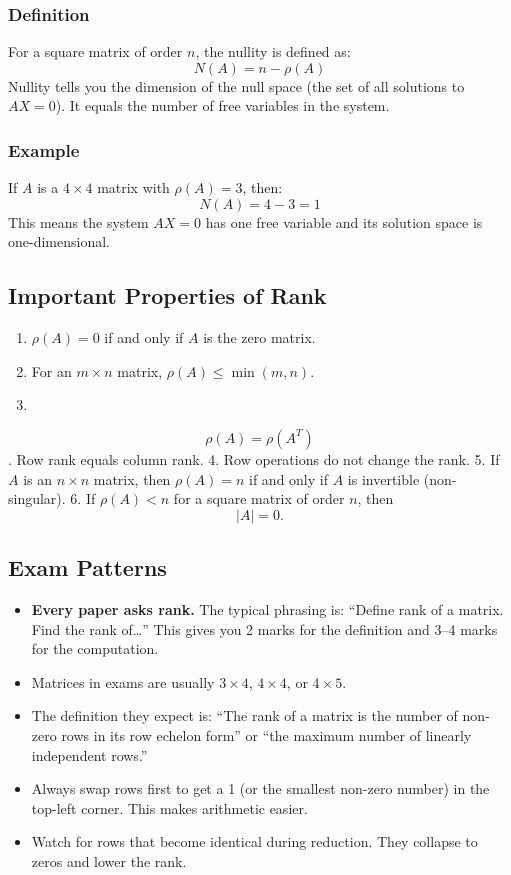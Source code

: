 \documentclass[
]{article}
\providecommand{\tightlist}{%
  \setlength{\itemsep}{0pt}\setlength{\parskip}{0pt}}
\begin{document}
\subsubsection{Definition}\label{definition-12}

For a square matrix of order \(n\), the nullity is defined as:
\[
N(A) = n - \rho(A)
\]
Nullity tells you the dimension of the null space (the set of all
solutions to \(AX = 0\)). It equals the number of free variables in the
system.

\subsubsection{Example}\label{example-4}

If \(A\) is a \(4 \times 4\) matrix with \(\rho(A) = 3\), then:
\[
N(A) = 4 - 3 = 1
\]
This means the system \(AX = 0\) has one free variable and its solution
space is one-dimensional.

\subsection{Important Properties of
Rank}\label{important-properties-of-rank}

\begin{enumerate}
\def\labelenumi{\arabic{enumi}.}
\tightlist
\item
  \(\rho(A) = 0\) if and only if \(A\) is the zero matrix.
\item
  For an \(m \times n\) matrix, \(\rho(A) \leq \min(m, n)\).
\item
\end{enumerate}
\[
\rho(A) = \rho(A^T)
\]
. Row rank equals column rank. 4. Row operations do not change the rank.
5. If \(A\) is an \(n \times n\) matrix, then \(\rho(A) = n\) if and
only if \(A\) is invertible (non-singular). 6. If \(\rho(A) < n\) for a
square matrix of order \(n\), then
\[
\lvert A \rvert = 0.
\]

\subsection{Exam Patterns}\label{exam-patterns-20}

\begin{itemize}
\tightlist
\item
  \textbf{Every paper asks rank.} The typical phrasing is: ``Define rank
  of a matrix. Find the rank of\ldots{}'' This gives you 2 marks for the
  definition and 3--4 marks for the computation.
\item
  Matrices in exams are usually \(3 \times 4\), \(4 \times 4\), or
  \(4 \times 5\).
\item
  The definition they expect is: ``The rank of a matrix is the number of
  non-zero rows in its row echelon form'' or ``the maximum number of
  linearly independent rows.''
\item
  Always swap rows first to get a 1 (or the smallest non-zero number) in
  the top-left corner. This makes arithmetic easier.
\item
  Watch for rows that become identical during reduction. They collapse
  to zeros and lower the rank.
\end{itemize}
\end{document}
